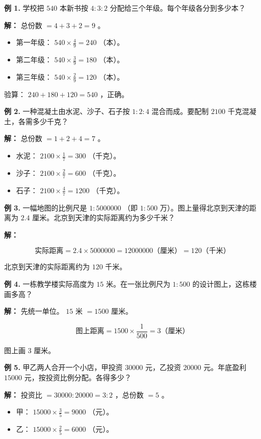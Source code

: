 \begin{workedexamples}


\textbf{例 1.} 学校把 $540$ 本新书按 $4 : 3 : 2$ 分配给三个年级。每个年级各分到多少本？

\textbf{解：} 总份数 $= 4 + 3 + 2 = 9$ 。
\begin{itemize}
  \item 第一年级： $540 \times \frac{4}{9} = 240$ （本）。
  \item 第二年级： $540 \times \frac{3}{9} = 180$ （本）。
  \item 第三年级： $540 \times \frac{2}{9} = 120$ （本）。
\end{itemize}


验算： $240 + 180 + 120 = 540$ ，正确。

\textbf{例 2.} 一种混凝土由水泥、沙子、石子按 $1 : 2 : 4$ 混合而成。要配制 $2100$ 千克混凝土，各需多少千克？

\textbf{解：} 总份数 $= 1 + 2 + 4 = 7$ 。
\begin{itemize}
  \item 水泥： $2100 \times \frac{1}{7} = 300$ （千克）。
  \item 沙子： $2100 \times \frac{2}{7} = 600$ （千克）。
  \item 石子： $2100 \times \frac{4}{7} = 1200$ （千克）。
\end{itemize}


\textbf{例 3.} 一幅地图的比例尺是 $1 : 5000000$ （即 $1 : 500$ 万）。图上量得北京到天津的距离为 $2.4$ 厘米。北京到天津的实际距离约为多少千米？

\textbf{解：}

\[
\text{实际距离} = 2.4 \times 5000000 = 12000000 \text{（厘米）} = 120 \text{（千米）}
\]


北京到天津的实际距离约为 $120$ 千米。

\textbf{例 4.} 一栋教学楼实际高度为 $15$ 米。在一张比例尺为 $1 : 500$ 的设计图上，这栋楼画多高？

\textbf{解：} 先统一单位。 $15$ 米 $= 1500$ 厘米。

\[
\text{图上距离} = 1500 \times \frac{1}{500} = 3 \text{（厘米）}
\]


图上画 $3$ 厘米。

\textbf{例 5.} 甲乙两人合开一个小店，甲投资 $30000$ 元，乙投资 $20000$ 元。年底盈利 $15000$ 元，按投资比例分配。各得多少？

\textbf{解：} 投资比 $= 30000 : 20000 = 3 : 2$ ，总份数 $= 5$ 。
\begin{itemize}
  \item 甲： $15000 \times \frac{3}{5} = 9000$ （元）。
  \item 乙： $15000 \times \frac{2}{5} = 6000$ （元）。
\end{itemize}


\end{workedexamples}

